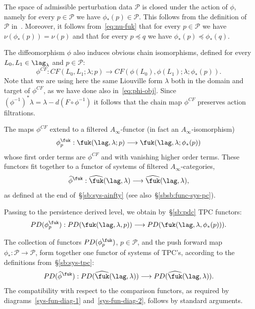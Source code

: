 The space of admissible perturbation data
$\mathcal{P}$ is closed under the action of $\phi$, namely for every
$p \in \mathcal{P}$ we have $\phi_*(p) \in \mathcal{P}$. This follows
from the definition of $\mathcal{P}$ in~\cite{Amb:fil-fuk}. Moreover,
it follows from~\eqref{eq:nu-fuk} that for every $p \in \mathcal{P}$ we
have $\nu(\phi_*(p)) = \nu(p)$ and that for every $p \preceq q$ we
have $\phi_*(p) \preceq \phi_*(q)$.

The diffeomorphism $\phi$ also induces obvious chain isomorphisms,
defined for every $L_0, L_1 \in \lag_{\lambda}$ and
$p \in \mathcal{P}$:
\begin{equation} \label{eq:phi-chain} \phi^{CF} : CF(L_0, L_1;
  \lambda; p) \longrightarrow CF(\phi(L_0), \phi(L_1); \lambda;
  \phi_*(p)).
\end{equation}
Note that we are using here the same Liouville form $\lambda$ both in
the domain and target of $\phi^{CF}$, as we have done also
in~\eqref{eq:phi-obj}. Since
$(\phi^{-1})^*\lambda = \lambda - d(F \circ \phi^{-1})$ it follows
that the chain map $\phi^{CF}$ preserves action filtrations.

The maps $\phi^{CF}$ extend to a filtered $A_{\infty}$-functor (in
fact an $A_{\infty}$-isomorphism)
\begin{equation} \label{eq:phi-fun-1} \phi^{\fuk}_p: \fuk(\lag,
  \lambda; p) \longrightarrow \fuk(\lag, \lambda; \phi_*(p))
\end{equation}
whose first order terms are $\phi^{CF}$ and with vanishing higher
order terms. These functors fit together to a functor of systems of
filtered $A_{\infty}$-categories,
$$\widehat{\phi}^{\fuk}: \widehat{\fuk}(\lag, \lambda) \longrightarrow
\widehat{\fuk}(\lag, \lambda),$$ as defined at the end
of~\S\ref{sb:sys-ainfty} (see also~\S\ref{sbsb:func-sys-pc}).

Passing to the persistence derived level, we obtain by~\S\ref{sb:pdc}
TPC functors:
\begin{equation} \label{eq:phi-fun-2} PD(\phi^{\fuk}_p): PD(\fuk(\lag,
  \lambda, p)) \longrightarrow PD(\fuk(\lag, \lambda, \phi_*(p))).
\end{equation}

The collection of functors $PD(\phi_p^{\fuk})$, $p \in \mathcal{P}$,
and the push forward map
$\phi_*: \mathcal{P} \longrightarrow \mathcal{P}$, form together one
functor of systems of TPC's, according to the definitions
from~\S\ref{sb:sys-tpc}:
\begin{equation} \label{eq:phi-fun-3} PD(\widehat{\phi}^{\fuk}) :
  PD(\widehat{\fuk}(\lag, \lambda)) \longrightarrow
  PD(\widehat{\fuk}(\lag, \lambda)).
\end{equation}
The compatibility with respect to the comparison functors, as required
by diagrams~\eqref{sys-fun-diag-1} and~\eqref{sys-fun-diag-2}, follows
by standard arguments.

